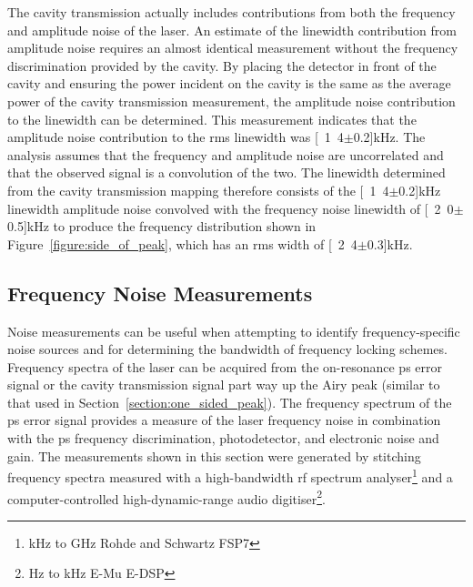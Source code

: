 The cavity transmission actually includes contributions from both the frequency and amplitude noise of the laser.
An estimate of the linewidth contribution from amplitude noise requires an almost identical measurement without the frequency discrimination provided by the cavity.
By placing the detector in front of the cavity and ensuring the power incident on the cavity is the same as the average power of the cavity transmission measurement, the amplitude noise contribution to the linewidth can be determined.
This measurement indicates that the amplitude noise contribution to the \gls{rms} linewidth was \unit[1.4$\pm$0.2]{kHz}.
The analysis assumes that the frequency and amplitude noise are uncorrelated and that the observed signal is a convolution of the two.
The linewidth determined from the cavity transmission mapping therefore consists of the \unit[1.4$\pm$0.2]{kHz} linewidth amplitude noise convolved with the frequency noise linewidth of \unit[2.0$\pm$0.5]{kHz} to produce the frequency distribution shown in Figure~\ref{figure:side_of_peak}, which has an \gls{rms} width of \unit[2.4$\pm$0.3]{kHz}.

\subsection{Frequency Noise Measurements}

Noise measurements can be useful when attempting to identify frequency-specific noise sources and for determining the bandwidth of frequency locking schemes.
Frequency spectra of the laser can be acquired from the on-resonance \gls{ps} error signal or the cavity transmission signal part way up the Airy peak (similar to that used in Section~\ref{section:one_sided_peak}).
The frequency spectrum of the \gls{ps} error signal provides a measure of the laser frequency noise in combination with the \gls{ps} frequency discrimination, photodetector, and electronic noise and gain.
The measurements shown in this section were generated by stitching frequency spectra measured with a high-bandwidth \gls{rf} spectrum analyser\footnote{\unit[9]{kHz} to \unit[7]{GHz} Rohde and Schwartz FSP7} and a computer-controlled high-dynamic-range audio digitiser\footnote{\unit[24]{Hz} to \unit[100]{kHz} E-Mu E-DSP}.

